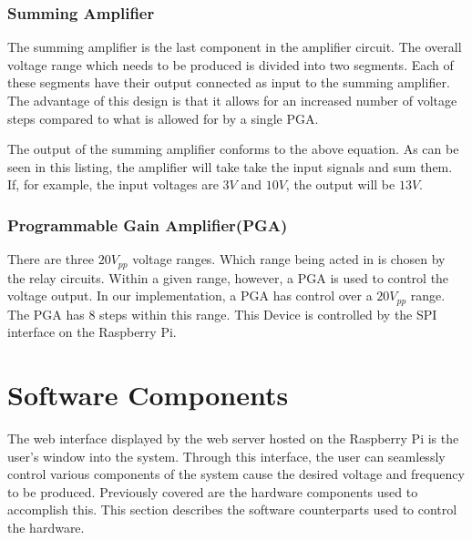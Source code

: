 \documentclass{article}	%
\begin{document}
\begin{multicols}{2}

\subsubsection{Summing Amplifier}
The summing amplifier is the last component
in the amplifier circuit.
The overall voltage range which needs to be produced is divided into two segments.
Each of these segments have their output connected as
input to the summing amplifier.
The advantage of this design is that
it allows for an increased number of voltage steps
compared to what is allowed for by a single PGA.


The output of the summing amplifier conforms to
the above equation.
As can be seen in this listing,
the amplifier will take take the input signals
and sum them.
If, for example, 
the input voltages are $3V$ and $10V$, the
output will be $13V$.

\subsubsection{Programmable Gain Amplifier(PGA)}
There are three $20V_{pp}$ voltage ranges.
Which range being acted in is chosen by the relay circuits.
Within a given range,
however,
a PGA is used to control the voltage output.
In our implementation,
a PGA has control over a $20V_{pp}$ range.
The PGA has 8 steps within this range.
This Device is controlled by 
the SPI interface on the Raspberry Pi.


\section{Software Components}
The web interface displayed by
the web server hosted on the Raspberry Pi
is the user's window into the system.
Through this interface,
the user can seamlessly control various
components of the system cause 
the desired voltage and frequency 
to be produced.
Previously covered are
the hardware components used to accomplish this.
This section describes the software counterparts
used to control the hardware.


\end{multicols}
\end{document}

